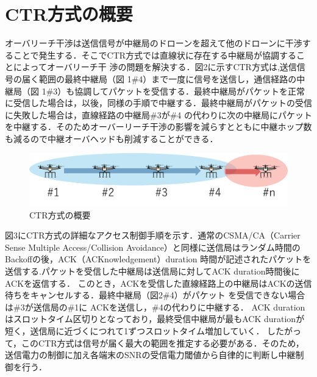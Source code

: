 \documentclass[a4paper,10pt]{ltjsarticle}
\begin{document}
\section{CTR方式の概要}
オーバリーチ干渉は送信信号が中継局のドローンを超えて他のドローンに干渉することで発生する．そこでCTR方式では直線状に存在する中継局が協調することによってオーバリーチ干
渉の問題を解決する．図2に示すCTR方式は,送信信号の届く範囲の最終中継局（図 1\#4）まで一度に信号を送信し，通信経路の中継局（図 1\#3）も協調してパケットを受信する．最終中継局がパケットを正常に受信した場合は，以後，同様の手順で中継する．最終中継局がパケットの受信に失敗した場合は，直線経路の中継局\#3が\#4 の代わりに次の中継局にパケットを中継する．そのためオーバーリーチ干渉の影響を減らすとともに中継ホップ数も減るので中継オーバヘッドも削減することができる．%
\begin{figure}[H]
  \centering
  \includegraphics[width=\linewidth]{ctr_topology.png} %
  \caption{CTR方式の概要}
  \label{fig:CTR方式のトポロジー} %
\end{figure}
図3にCTR方式の詳細なアクセス制御手順を示す．通常のCSMA/CA（Carrier Sense Multiple Access/Collision Avoidance）と同様に送信局はランダム時間のBackoffの後，ACK（ACKnowledgement）duration
時間が記述されたパケットを送信する.パケットを受信した中継局は送信局に対してACK duration時間後にACKを返信する．
このとき，ACKを受信した直線経路上の中継局はACKの送信待ちをキャンセルする．最終中継局（図2\#4）がパケット を受信できない場合は\#3が送信局の\#1に ACKを送信し，\#4の代わりに中継する．
ACK duration はスロットタイム区切りとなっており，最終受信中継局が最もACK durationが短く，送信局に近づくにつれて1ずつスロットタイム増加していく．
したがって，このCTR方式は信号が届く最大の範囲を推定する必要がある．そのため，送信電力の制御に加え各端末のSNRの受信電力閾値から自律的に判断し中継制御を行う．
\end{document}
